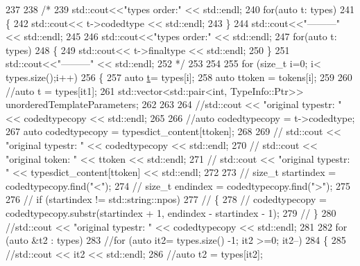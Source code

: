 \begin{DoxyCode}
237 
238     \textcolor{comment}{/*}
239 \textcolor{comment}{    std::cout<<"types order:" << std::endl;}
240 \textcolor{comment}{    for(auto t: types)}
241 \textcolor{comment}{    \{}
242 \textcolor{comment}{        std::cout<< t->codedtype << std::endl;}
243 \textcolor{comment}{    \}}
244 \textcolor{comment}{    std::cout<<"---------" << std::endl;}
245 \textcolor{comment}{}
246 \textcolor{comment}{    std::cout<<"types order:" << std::endl;}
247 \textcolor{comment}{    for(auto t: types)}
248 \textcolor{comment}{    \{}
249 \textcolor{comment}{        std::cout<< t->finaltype << std::endl;}
250 \textcolor{comment}{    \}}
251 \textcolor{comment}{    std::cout<<"---------" << std::endl;}
252 \textcolor{comment}{    */}
253 
254     
255     \textcolor{keywordflow}{for} (\textcolor{keywordtype}{size\_t} i=0; i< types.size();i++)
256     \{
257         \textcolor{keyword}{auto} \hyperlink{namespacebattery__monitor__node_a7a63d20d1ea461e280f4eb5b47f925cd}{t}= types[i];
258         \textcolor{keyword}{auto} ttoken = tokens[i];
259 
260         \textcolor{comment}{//auto t = types[it1];}
261         std::vector<std::pair<int, TypeInfo::Ptr>> unorderedTemplateParameters;
262 
263         
264         \textcolor{comment}{//std::cout << "original typestr: " << codedtypecopy << std::endl;}
265 
266         \textcolor{comment}{//auto codedtypecopy = t->codedtype;}
267         \textcolor{keyword}{auto} codedtypecopy = typesdict\_content[ttoken];
268 
269         \textcolor{comment}{// std::cout << "original typestr: " << codedtypecopy << std::endl;}
270         \textcolor{comment}{// std::cout << "original token: " << ttoken << std::endl;}
271         \textcolor{comment}{// std::cout << "original typestr: " << typesdict\_content[ttoken] << std::endl;}
272 
273         \textcolor{comment}{// size\_t startindex = codedtypecopy.find("<");}
274         \textcolor{comment}{// size\_t endindex = codedtypecopy.find(">");}
275 
276         \textcolor{comment}{// if (startindex != std::string::npos)}
277         \textcolor{comment}{// \{}
278         \textcolor{comment}{//     codedtypecopy = codedtypecopy.substr(startindex + 1, endindex - startindex - 1);}
279         \textcolor{comment}{// \}}
280         \textcolor{comment}{//std::cout << "original typestr: " << codedtypecopy << std::endl;}
281 
282         \textcolor{keywordflow}{for} (\textcolor{keyword}{auto} &t2 : types)
283         \textcolor{comment}{//for (auto it2= types.size() -1; it2 >=0; it2--)}
284         \{
285             \textcolor{comment}{//std::cout << it2 << std::endl;}
286             \textcolor{comment}{//auto t2 = types[it2];}

\end{DoxyCode}
